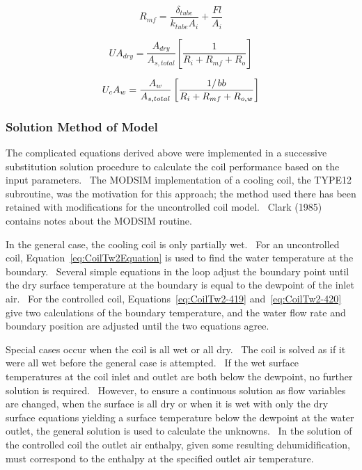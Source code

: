 \begin{equation}
{R_{mf}} = \frac{{{\delta_{tube}}}}{{{k_{tube}}{A_i}}} + \frac{{Fl}}{{{A_i}}}
\label{eq:CoilRmf}
\end{equation}

\begin{equation}
U{A_{dry}} = \frac{{{A_{dry}}}}{{{A_{s,total}}}}\left[ {\frac{1}{{{R_i} + {R_{mf}} + {R_o}}}} \right]
\label{eq:CoilUAdry}
\end{equation}

\begin{equation}
{U_c}{A_w} = \frac{{{A_w}}}{{{A_{s,total}}}}\left[ {\frac{{{1 \mathord{\left/ {\vphantom {1 {bb}}} \right. } {bb}}}}{{{R_i} + {R_{mf}} + {R_{o,w}}}}} \right]
\label{eq:CoilUcAw}
\end{equation}

\subsubsection{Solution Method of Model}\label{solution-method-of-model}

The complicated equations derived above were implemented in a successive substitution solution procedure to calculate the coil performance based on the input parameters.~ The MODSIM implementation of a cooling coil, the TYPE12 subroutine, was the motivation for this approach; the method used there has been retained with modifications for the uncontrolled coil model.~ Clark (1985) contains notes about the MODSIM routine.

In the general case, the cooling coil is only partially wet.~ For an uncontrolled coil, Equation~\ref{eq:CoilTw2Equation} is used to find the water temperature at the boundary.~ Several simple equations in the loop adjust the boundary point until the dry surface temperature at the boundary is equal to the dewpoint of the inlet air.~ For the controlled coil, Equations~\ref{eq:CoilTw2-419} and~\ref{eq:CoilTw2-420} give two calculations of the boundary temperature, and the water flow rate and boundary position are adjusted until the two equations agree.

Special cases occur when the coil is all wet or all dry.~ The coil is solved as if it were all wet before the general case is attempted.~ If the wet surface temperatures at the coil inlet and outlet are both below the dewpoint, no further solution is required.~ However, to ensure a continuous solution as flow variables are changed, when the surface is all dry or when it is wet with only the dry surface equations yielding a surface temperature below the dewpoint at the water outlet, the general solution is used to calculate the unknowns.~ In the solution of the controlled coil the outlet air enthalpy, given some resulting dehumidification, must correspond to the enthalpy at the specified outlet air temperature.

